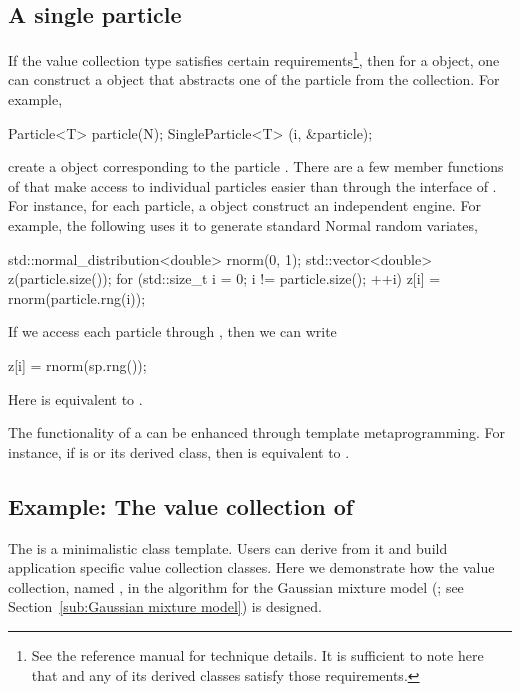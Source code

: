 \subsection{A single particle}
\label{sub:A single particle}

If the value collection type  satisfies certain requirements\footnote{See the reference manual for technique details. It is sufficient to note here that  and any of its derived classes satisfy those requirements.}, then for a  object, one can construct a  object that abstracts one of the particle from the collection. For example,
\begin{cppcode}
Particle<T> particle(N);
SingleParticle<T> (i, &particle);
\end{cppcode}
create a  object corresponding to the particle . There are a few member functions of  that make access to individual particles easier than through the interface of . For instance, for each particle, a  object construct an independent \cppoo{} \rng engine. For example, the following uses it to generate standard Normal random variates,
\begin{cppcode}
std::normal_distribution<double> rnorm(0, 1);
std::vector<double> z(particle.size());
for (std::size_t i = 0; i != particle.size(); ++i)
    z[i] = rnorm(particle.rng(i));
\end{cppcode}
If we access each particle through , then we can write
\begin{cppcode}
z[i] = rnorm(sp.rng());
\end{cppcode}
Here  is equivalent to .

The functionality of a  can be enhanced through template metaprogramming. For instance, if  is  or its derived class, then  is equivalent to .

\subsection{Example: The value collection of \protect\gmm}
\label{sub:Example: The value collection of gmm}

The  is a minimalistic class template. Users can derive from it and build application specific value collection classes. Here we demonstrate how the value collection, named , in the \smc[2] algorithm for the Gaussian mixture model (\gmm; see Section~\ref{sub:Gaussian mixture model}) is designed.

